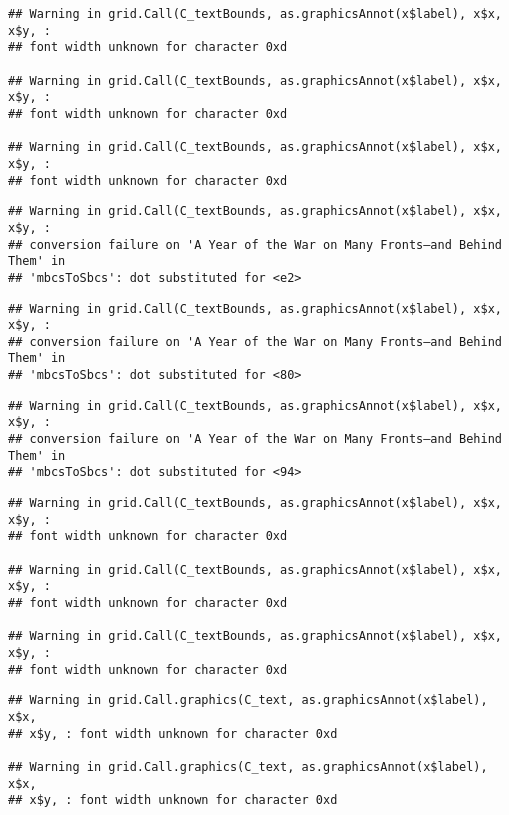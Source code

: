 \documentclass[]{article}
\begin{document}
\begin{verbatim}
## Warning in grid.Call(C_textBounds, as.graphicsAnnot(x$label), x$x, x$y, :
## font width unknown for character 0xd

## Warning in grid.Call(C_textBounds, as.graphicsAnnot(x$label), x$x, x$y, :
## font width unknown for character 0xd

## Warning in grid.Call(C_textBounds, as.graphicsAnnot(x$label), x$x, x$y, :
## font width unknown for character 0xd
\end{verbatim}

\begin{verbatim}
## Warning in grid.Call(C_textBounds, as.graphicsAnnot(x$label), x$x, x$y, :
## conversion failure on 'A Year of the War on Many Fronts—and Behind Them' in
## 'mbcsToSbcs': dot substituted for <e2>
\end{verbatim}

\begin{verbatim}
## Warning in grid.Call(C_textBounds, as.graphicsAnnot(x$label), x$x, x$y, :
## conversion failure on 'A Year of the War on Many Fronts—and Behind Them' in
## 'mbcsToSbcs': dot substituted for <80>
\end{verbatim}

\begin{verbatim}
## Warning in grid.Call(C_textBounds, as.graphicsAnnot(x$label), x$x, x$y, :
## conversion failure on 'A Year of the War on Many Fronts—and Behind Them' in
## 'mbcsToSbcs': dot substituted for <94>
\end{verbatim}

\begin{verbatim}
## Warning in grid.Call(C_textBounds, as.graphicsAnnot(x$label), x$x, x$y, :
## font width unknown for character 0xd

## Warning in grid.Call(C_textBounds, as.graphicsAnnot(x$label), x$x, x$y, :
## font width unknown for character 0xd

## Warning in grid.Call(C_textBounds, as.graphicsAnnot(x$label), x$x, x$y, :
## font width unknown for character 0xd
\end{verbatim}

\begin{verbatim}
## Warning in grid.Call.graphics(C_text, as.graphicsAnnot(x$label), x$x,
## x$y, : font width unknown for character 0xd

## Warning in grid.Call.graphics(C_text, as.graphicsAnnot(x$label), x$x,
## x$y, : font width unknown for character 0xd
\end{verbatim}
\end{document}
